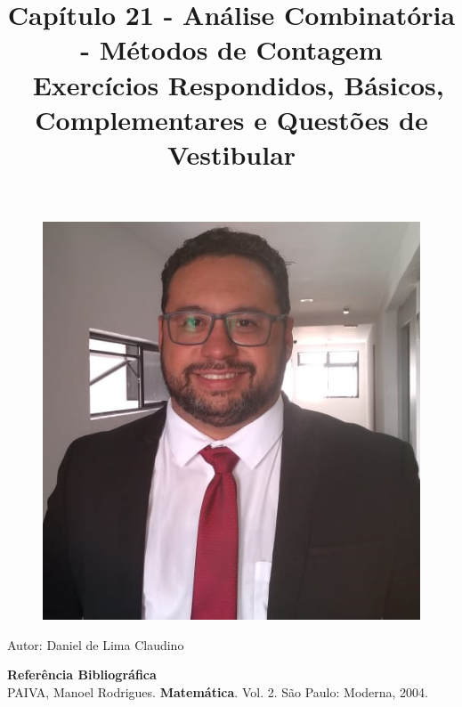 \documentclass[a4paper,12pt]{article}
\begin{document}
\title{{\huge Capítulo 21 - Análise Combinatória - Métodos de Contagem} \\ 
  \, \linebreak \linebreak \linebreak Exercícios Respondidos, Básicos, Complementares e Questões de Vestibular
}
\date{}

\maketitle 

\begin{figure}[htb]
 \centering
 \includegraphics[scale=0.4]{../../imagens/FOTO-PERFIL-DANIEL-CLAUDINO-2020.png}
\end{figure}

\begin{center}
  \begin{large}
    {\huge Autor: Daniel de Lima Claudino \linebreak \linebreak} 
  \end{large}
\end{center}

\begin{flushright}
  \begin{small}
    {\large \textbf{Referência Bibliográfica}\\PAIVA, Manoel Rodrigues. \textbf{Matemática}. Vol. 2. São Paulo: Moderna, 2004.} 
  \end{small}
\end{flushright}
\end{document}
